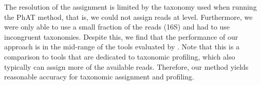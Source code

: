 

The resolution of the assignment is limited by the taxonomy used when running the \ac{PhAT} method,
that is, we could not assign reads at  level.
Furthermore, we were only able to use a small fraction of the reads (16S) and had to use incongruent taxonomies.
Despite this, we find that the performance of our approach is in the mid-range of the tools evaluated by .
Note that this is a comparison to tools that are dedicated to taxonomic profiling,
which also typically can assign more of the available reads.
Therefore, our method yields reasonable accuracy for taxonomic assignment and profiling.


